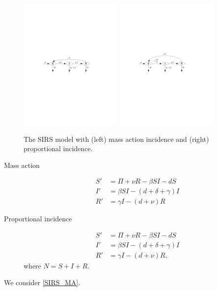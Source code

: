 \begin{figure}[htbp]
\begin{center}
\includegraphics[width=0.45\textwidth]{../figs_04_epidemic_models/SIRS_massaction}
\includegraphics[width=0.45\textwidth]{../figs_04_epidemic_models/SIRS_propincidence}
\caption{The SIRS model with (left) mass action incidence and (right) proportional incidence.}
\end{center}
\end{figure}

\begin{description}
\item[Mass action]
\begin{subequations}\label{SIRS_MA}
\begin{align}
S' &= \Pi+\nu R-\beta SI-dS \label{SIRS_MA_S} \\
I' &= \beta SI-(d+\delta+\gamma)I \label{SIRS_MA_I} \\
R' &= \gamma I-(d+\nu)R \label{SIRS_MA_R}
\end{align}
\end{subequations}
\item[Proportional incidence]
\begin{subequations}\label{SIRS_P}
\begin{align}
S' &= \Pi+\nu R-\beta SI-dS \label{SIRS_P_S} \\
I' &= \beta SI-(d+\delta+\gamma)I \label{SIRS_P_I} \\
R' &= \gamma I-(d+\nu)R, \label{SIRS_P_R}
\end{align}
\end{subequations}
where $N=S+I+R$.
\end{description}
We consider \eqref{SIRS_MA}.

